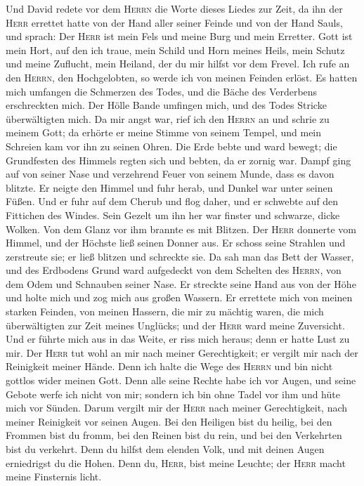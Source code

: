  Und David redete vor dem \textsc{Herrn} die Worte dieses
Liedes zur Zeit, da ihn der \textsc{Herr} errettet hatte von der Hand
aller seiner Feinde und von der Hand Sauls, und sprach: 
Der \textsc{Herr} ist mein Fels und meine Burg und mein Erretter.
 Gott ist mein Hort, auf den ich traue, mein Schild und
Horn meines Heils, mein Schutz und meine Zuflucht, mein Heiland, der du
mir hilfst vor dem Frevel.  Ich rufe an den
\textsc{Herrn}, den Hochgelobten, so werde ich von meinen Feinden
erlöst.  Es hatten mich umfangen die Schmerzen des Todes,
und die Bäche des Verderbens erschreckten mich.  Der Hölle
Bande umfingen mich, und des Todes Stricke überwältigten mich.
 Da mir angst war, rief ich den \textsc{Herrn} an und
schrie zu meinem Gott; da erhörte er meine Stimme von seinem Tempel, und
mein Schreien kam vor ihn zu seinen Ohren.  Die Erde bebte
und ward bewegt; die Grundfesten des Himmels regten sich und bebten, da
er zornig war.  Dampf ging auf von seiner Nase und
verzehrend Feuer von seinem Munde, dass es davon blitzte.
 Er neigte den Himmel und fuhr herab, und Dunkel war
unter seinen Füßen.  Und er fuhr auf dem Cherub und flog
daher, und er schwebte auf den Fittichen des Windes. 
Sein Gezelt um ihn her war finster und schwarze, dicke Wolken.
 Von dem Glanz vor ihm brannte es mit Blitzen.
 Der \textsc{Herr} donnerte vom Himmel, und der Höchste
ließ seinen Donner aus.  Er schoss seine Strahlen und
zerstreute sie; er ließ blitzen und schreckte sie.  Da
sah man das Bett der Wasser, und des Erdbodens Grund ward aufgedeckt von
dem Schelten des \textsc{Herrn}, von dem Odem und Schnauben seiner Nase.
 Er streckte seine Hand aus von der Höhe und holte mich
und zog mich aus großen Wassern.  Er errettete mich von
meinen starken Feinden, von meinen Hassern, die mir zu mächtig waren,
 die mich überwältigten zur Zeit meines Unglücks; und der
\textsc{Herr} ward meine Zuversicht.  Und er führte mich
aus in das Weite, er riss mich heraus; denn er hatte Lust zu mir.
 Der \textsc{Herr} tut wohl an mir nach meiner
Gerechtigkeit; er vergilt mir nach der Reinigkeit meiner Hände.
 Denn ich halte die Wege des \textsc{Herrn} und bin nicht
gottlos wider meinen Gott.  Denn alle seine Rechte habe
ich vor Augen, und seine Gebote werfe ich nicht von mir; 
sondern ich bin ohne Tadel vor ihm und hüte mich vor Sünden.
 Darum vergilt mir der \textsc{Herr} nach meiner
Gerechtigkeit, nach meiner Reinigkeit vor seinen Augen. 
Bei den Heiligen bist du heilig, bei den Frommen bist du fromm,
 bei den Reinen bist du rein, und bei den Verkehrten bist
du verkehrt.  Denn du hilfst dem elenden Volk, und mit
deinen Augen erniedrigst du die Hohen.  Denn du,
\textsc{Herr}, bist meine Leuchte; der \textsc{Herr} macht meine
Finsternis licht.

